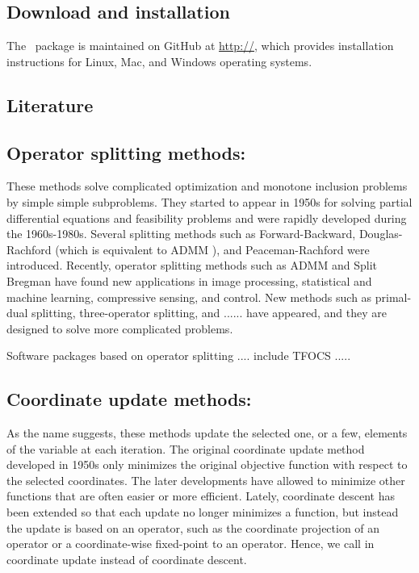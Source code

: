 
\subsection{Download and installation}
The \pkg~package is maintained on GitHub at \url{http://}, which provides installation instructions for Linux, Mac, and Windows operating systems. 
\subsection{Literature}
\subsection*{Operator splitting methods:}  These methods solve complicated optimization and monotone inclusion problems by simple simple subproblems. They started to appear in 1950s for  solving partial differential equations and feasibility problems and were rapidly developed during the 1960s-1980s. Several splitting methods such as Forward-Backward, Douglas-Rachford  (which is equivalent to ADMM \cite{?,?}), and Peaceman-Rachford were introduced. Recently,
operator splitting methods such as ADMM and Split Bregman have found new applications in image processing,
statistical and machine learning, compressive sensing, and control. New methods such as primal-dual splitting, three-operator splitting, and ...... have appeared, and they are designed to  solve more complicated problems.

Software packages based on operator splitting  .... include TFOCS .....

\subsection*{Coordinate update methods:}
As the name suggests, these methods update the selected one, or a few, elements of the variable at each iteration. The original  coordinate update method developed in 1950s only minimizes the original objective function with respect to the selected coordinates. The later developments have allowed to minimize other functions that are often easier or more efficient. Lately, coordinate descent has been extended so that each update no longer minimizes a function, but instead the update is based on an operator, such as the coordinate projection of an operator or a coordinate-wise fixed-point to an operator. Hence, we call in coordinate update instead of coordinate descent. 

